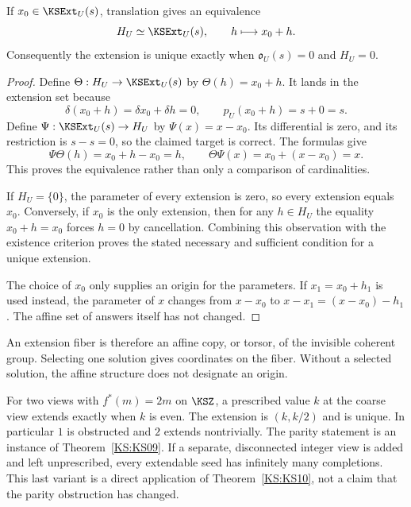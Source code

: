 \begin{KStheorem}\label{KS:KS10}
If \(x_0\in\KSExt_U(s)\), translation gives an equivalence
\[
 H_U\simeq\KSExt_U(s),\qquad h\longmapsto x_0+h.
\]
Consequently the extension is unique exactly when \(\mathfrak o_U(s)=0\) and \(H_U=0\).
\end{KStheorem}
\begin{proof}
Define $\Theta:H_U\to\KSExt_U(s)$ by $\Theta(h)=x_0+h$. It lands in the extension set because
\[
 \delta(x_0+h)=\delta x_0+\delta h=0,
 \qquad p_U(x_0+h)=s+0=s.
\]
Define $\Psi:\KSExt_U(s)\to H_U$ by $\Psi(x)=x-x_0$. Its differential is zero, and its restriction is $s-s=0$, so the claimed target is correct. The formulas give
\[
 \Psi\Theta(h)=x_0+h-x_0=h,\qquad
 \Theta\Psi(x)=x_0+(x-x_0)=x.
\]
This proves the equivalence rather than only a comparison of cardinalities.

If $H_U=\{0\}$, the parameter of every extension is zero, so every extension equals $x_0$. Conversely, if $x_0$ is the only extension, then for any $h\in H_U$ the equality $x_0+h=x_0$ forces $h=0$ by cancellation. Combining this observation with the existence criterion proves the stated necessary and sufficient condition for a unique extension.

The choice of $x_0$ only supplies an origin for the parameters. If $x_1=x_0+h_1$ is used instead, the parameter of $x$ changes from $x-x_0$ to $x-x_1=(x-x_0)-h_1$. The affine set of answers itself has not changed.
\end{proof}
An extension fiber is therefore an affine copy, or torsor, of the invisible coherent group. Selecting one solution gives coordinates on the fiber. Without a selected solution, the affine structure does not designate an origin.

\begin{KSexample}
For two views with \(f^*(m)=2m\) on \(\KSZ\), a prescribed value \(k\) at the coarse view extends exactly when \(k\) is even. The extension is \((k,k/2)\) and is unique. In particular \(1\) is obstructed and \(2\) extends nontrivially. The parity statement is an instance of Theorem~\ref{KS:KS09}. If a separate, disconnected integer view is added and left unprescribed, every extendable seed has infinitely many completions. This last variant is a direct application of Theorem~\ref{KS:KS10}, not a claim that the parity obstruction has changed.
\end{KSexample}

